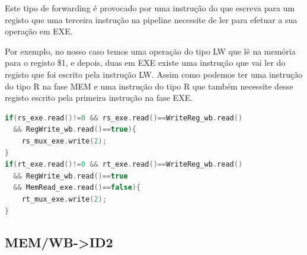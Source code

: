 \documentclass[pdftex,12pt,a4paper]{report}
\begin{document}
\begin{table}[!htb]
\centering
{}
\end{table}

Este tipo de forwarding é provocado por uma instrução do que escreva para um registo que uma terceira instrução na pipeline necessite de ler para efetuar a sua operação em EXE. 

Por exemplo, no nosso caso temos uma operação do tipo LW que lê na memória para o registo \$1, e depois, duas em EXE existe uma instrução que vai ler do registo que foi escrito pela instrução LW. Assim como podemos ter uma instrução do tipo R na fase MEM e uma instrução do tipo R que também necessite desse registo escrito pela primeira instrução na fase EXE. 

\begin{lstlisting}[language=c]
if(rs_exe.read()!=0 && rs_exe.read()==WriteReg_wb.read()
  && RegWrite_wb.read()==true){
    rs_mux_exe.write(2);
}
if(rt_exe.read()!=0 && rt_exe.read()==WriteReg_wb.read() 
  && RegWrite_wb.read()==true 
  && MemRead_exe.read()==false){
    rt_mux_exe.write(2);
}
\end{lstlisting} 

\subsection{MEM/WB->ID2}
\end{document}
